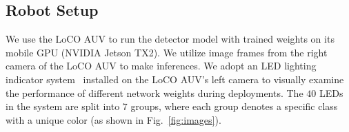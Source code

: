 \subsection{Robot Setup}\label{sec:robot_setup}
We use the LoCO AUV to run the detector model with trained weights on its mobile GPU (\ie NVIDIA Jetson TX2). 
We utilize image frames from the right camera of the LoCO AUV to make inferences. 
We adopt an LED lighting indicator system~\cite{fulton2023hreyes} 
installed on the LoCO AUV's left camera to visually examine the performance of different network weights during deployments. 
The $40$ LEDs in the system are split into $7$ groups, where each group denotes a specific class with a unique color (as shown in Fig.~\ref{fig:images}). 

